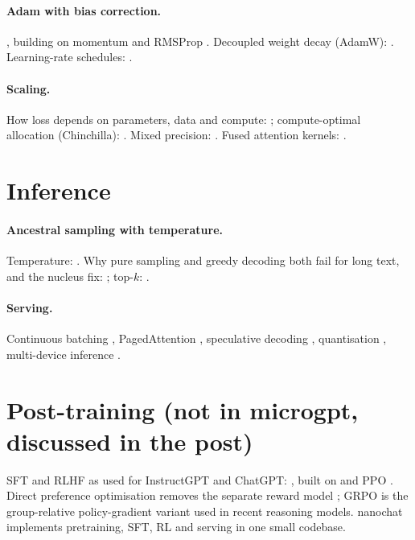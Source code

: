\documentclass[10pt,letterpaper]{article}
\newcounter{q}
\begin{document}
\paragraph{Adam with bias correction.} \textcite{kingma2015adam}, building on momentum \parencite{polyak1964momentum} and RMSProp \parencite{tieleman2012rmsprop}. Decoupled weight decay (AdamW): \textcite{loshchilov2019adamw}. Learning-rate schedules: \textcite{loshchilov2017sgdr}.

\paragraph{Scaling.} How loss depends on parameters, data and compute: \textcite{kaplan2020scaling}; compute-optimal allocation (Chinchilla): \textcite{hoffmann2022chinchilla}. Mixed precision: \textcite{micikevicius2018mixed}. Fused attention kernels: \textcite{dao2022flashattention,dao2024flashattention2}.

\section{Inference}

\paragraph{Ancestral sampling with temperature.} Temperature: \textcite{ackley1985boltzmann,hinton2015distilling}. Why pure sampling and greedy decoding both fail for long text, and the nucleus fix: \textcite{holtzman2020nucleus}; top-$k$: \textcite{fan2018hierarchical}.

\paragraph{Serving.} Continuous batching \parencite{yu2022orca}, PagedAttention \parencite{kwon2023vllm}, speculative decoding \parencite{leviathan2023speculative,chen2023speculative}, quantisation \parencite{dettmers2022int8,frantar2023gptq}, multi-device inference \parencite{pope2022efficiently}.

\section{Post-training (not in microgpt, discussed in the post)}

SFT and RLHF as used for InstructGPT and ChatGPT: \textcite{ouyang2022instructgpt}, built on \textcite{christiano2017rlhf} and PPO \parencite{schulman2017ppo}. Direct preference optimisation removes the separate reward model \parencite{rafailov2023dpo}; GRPO \parencite{shao2024grpo} is the group-relative policy-gradient variant used in recent reasoning models. nanochat \parencite{karpathy2025nanochat} implements pretraining, SFT, RL and serving in one small codebase.
\end{document}
